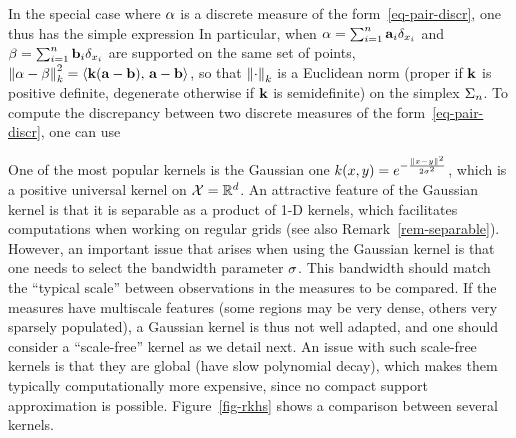In the special case where $\alpha$ is a discrete measure of the form~\eqref{eq-pair-discr}, one thus has the simple expression
In particular, when $\alpha=\sum_{i=1}^n \mathrm{\textbf{a}}_i \delta_{x_i}$ and $\beta=\sum_{i=1}^n \mathrm{\textbf{b}}_i \delta_{x_i}$ are supported on the same set of points, $\left\| \alpha-\beta \right\|_{k}^2 = \langle \mathrm{\textbf{k}}(\mathrm{\textbf{a}}-\mathrm{\textbf{b}}),\,\mathrm{\textbf{a}}-\mathrm{\textbf{b}}\rangle$, so that $\left\| \cdot \right\|_{k}$ is a Euclidean norm (proper if $\mathrm{\textbf{k}}$ is positive definite, degenerate otherwise if $\mathrm{\textbf{k}}$ is semidefinite) on the simplex $\Sigma_n$.
%
To compute the discrepancy between two discrete measures of the form~\eqref{eq-pair-discr}, one can use

\begin{example}\label{exmp-gaussian-kernel}
One of the most popular kernels is the Gaussian one $k(x,y) = e^{-\frac{\left\| x-y \right\|^2}{2 \sigma^2}}$, which is a positive universal kernel on $\mathcal{X}=\mathbb{R}^d$. 
%
An attractive feature of the Gaussian kernel is that it is separable as a product of 1-D kernels, which facilitates computations when working on regular grids (see also Remark~\ref{rem-separable}).
However, an important issue that arises when using the Gaussian kernel is that one needs to select the bandwidth parameter $\sigma$. This bandwidth should match the ``typical scale'' between observations in the measures to be compared. If the measures have multiscale features (some regions may be very dense, others very sparsely populated), a Gaussian kernel is thus not well adapted, and one should consider a ``scale-free'' kernel as we detail next. An issue with such scale-free kernels is that they are global (have slow polynomial decay), which makes them typically computationally more expensive, since no compact support approximation is possible.
%
Figure~\ref{fig-rkhs} shows a comparison between several kernels. 
\end{example}

